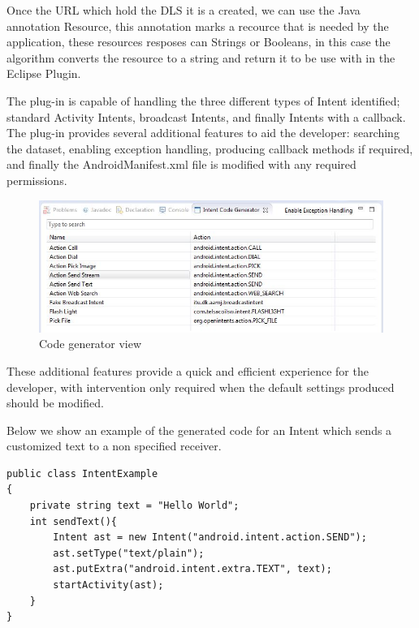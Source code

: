 Once the URL which hold the DLS it is a created, we can use the Java annotation Resource, this annotation marks a recource that is needed by the application, these resources resposes can Strings or Booleans, in this case the algorithm converts the resource to a string and return it to be use with in the Eclipse Plugin. 

 
The plug-in is capable of handling the three different types of Intent identified; standard Activity Intents, broadcast Intents, and finally Intents with a callback. The plug-in provides several additional features to aid the developer: searching the dataset, enabling exception handling, producing callback methods if required, and finally the AndroidManifest.xml file is modified with any required permissions.


\begin{figure}[t]
\label{codegeneratorview}
  \centering
    \includegraphics[width=\textwidth]{codegenerator}
  \caption{Code generator view}
\end{figure}

These additional features provide a quick and efficient experience for the developer, with intervention only required when the default settings produced should be modified.

Below we show an example of the generated code for an Intent which sends a customized text to a non specified receiver.

{\footnotesize\begin{lstlisting}
public class IntentExample
{
	private string text = "Hello World";
	int sendText(){
		Intent ast = new Intent("android.intent.action.SEND");
		ast.setType("text/plain");
		ast.putExtra("android.intent.extra.TEXT", text);
		startActivity(ast);		
	}
}
\end{lstlisting}}